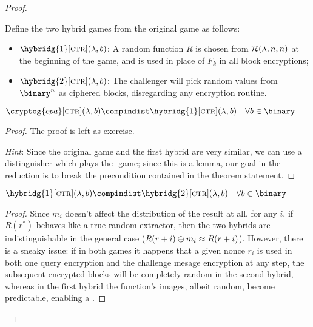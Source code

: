 \begin{proof}
\begin{cryptogame}
        \cseqendloop

        \cseqdelay
        

    \end{cryptogame}

    Define the two hybrid games from the original \cpa{} game as follows:

    \begin{itemize}
        \item $\hybridg{1}[\textsc{ctr}](\lambda, b)$: A random function $R$ is chosen \uar{} from $\mathcal{R}(\lambda, n, n)$ at the beginning of the game, and is used in place of $F_k$ in all block encryptions;
        \item $\hybridg{2}[\textsc{ctr}](\lambda, b)$: The challenger will pick random values from $\binary^n$ as ciphered blocks, disregarding any encryption routine.
    \end{itemize}

    \begin{lemma}
        $\cryptog{cpa}[\textsc{ctr}](\lambda, b) \compindist \hybridg{1}[\textsc{ctr}](\lambda, b) \quad \forall b \in \binary$
    \end{lemma}

    \begin{proof} The proof is left as exercise.
        
        \emph{Hint}: Since the original game and the first hybrid are very similar, we can use a distinguisher which plays the \cpa-game; since this is a lemma, our goal in the reduction is to break the precondition contained in the theorem statement.
    \end{proof}

    \begin{lemma}
        $\hybridg{1}[\textsc{ctr}](\lambda, b) \compindist \hybridg{2}[\textsc{ctr}](\lambda, b) \quad \forall b \in \binary$
    \end{lemma}

    \begin{proof}
    
        Since $m_i$ doesn't affect the distribution of the result at all, for any $i$, if $R(r^{*})$ behaves like a true random extractor, then the two hybrids are indistinguishable in the general case ($R(r + i) \oplus m_i \approx R(r + i)$). However, there is a sneaky issue: if in both games it happens that a given nonce $r_i$ is used in both one query encryption and the challenge mesage encryption at any step, the subsequent encrypted blocks will be completely random in the second hybrid, whereas in the first hybrid the function's images, albeit random, become predictable, enabling a \cpa.


\end{proof}
\end{proof}
